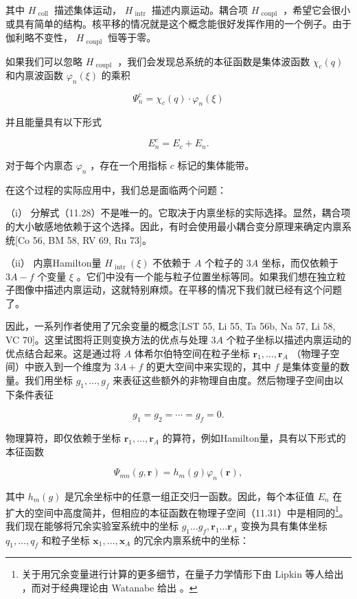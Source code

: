 其中 ${H}_{\text{ coll }}$ 描述集体运动， ${H}_{\text{ intr }}$ 描述内禀运动。耦合项
${H}_{\text{ coupl }}$ ，希望它会很小或具有简单的结构。核平移的情况就是这个概念能很好发挥作用的一个例子。由于伽利略不变性，
${H}_{\text{ coupl }}$ 恒等于零。

如果我们可以忽略 ${H}_{\text{ coupl }}$ ，我们会发现总系统的本征函数是集体波函数 ${\chi}_{c}\left(q\right)$
和内禀波函数 ${\varphi}_{n}\left(\xi\right)$ 的乘积

\[
{\Psi}^{c}_{n}={\chi}_{c}\left(q\right)\cdot{\varphi}_{n}\left(\xi\right)\tag{11.29}
\]

并且能量具有以下形式

\[
{E}^{c}_{n}={E}_{c}+{E}_{n}.\tag{11.30}
\]

对于每个内禀态 ${\varphi}_{n}$ ，存在一个用指标 $c$ 标记的集体能带。

在这个过程的实际应用中，我们总是面临两个问题：

（i） 分解式（11.28）不是唯一的。它取决于内禀坐标的实际选择。显然，耦合项的大小敏感地依赖于这个选择。因此，有时会使用最小耦合变分原理来确定内禀系统{[}Co
56, BM 58, RV 69, Ru 73{]}。

（ii） 内禀Hamilton量 ${H}_{\text{ intr }}\left(\xi\right)$ 不依赖于 $A$
个粒子的 ${3A}$ 坐标，而仅依赖于 ${3A}-f$ 个变量 $\xi$ 。它们中没有一个能与粒子位置坐标等同。如果我们想在独立粒子图像中描述内禀运动，这就特别麻烦。在平移的情况下我们就已经有这个问题了。

因此，一系列作者使用了冗余变量的概念{[}LST 55, Li 55, Ta 56b, Na 57, Li 58, VC 70{]}。这里试图将正则变换方法的优点与处理
${3A}$ 个粒子坐标以描述内禀运动的优点结合起来。这是通过将 $A$ 体希尔伯特空间在粒子坐标 ${\boldsymbol{r}}_{1},\ldots,{\boldsymbol{r}}_{A}$
（物理子空间）中嵌入到一个维度为 ${3A}+f$ 的更大空间中来实现的，其中 $f$ 是集体变量的数量。我们用坐标 ${g}_{1},\ldots,{g}_{f}$
来表征这些额外的非物理自由度。然后物理子空间由以下条件表征

\[
{g}_{1}={g}_{2}=\cdots={g}_{f}=0.\tag{11.31}
\]

物理算符，即仅依赖于坐标 ${\boldsymbol{r}}_{1},\ldots,{\boldsymbol{r}}_{A}$ 的算符，例如Hamilton量，具有以下形式的本征函数

\[
{\Psi}_{mn}\left({g,\boldsymbol{r}}\right)={h}_{m}\left(g\right){\varphi}_{n}\left(\boldsymbol{r}\right),\tag{11.32}
\]

其中 ${h}_{m}\left(g\right)$ 是冗余坐标中的任意一组正交归一函数。因此，每个本征值 ${E}_{n}$
在扩大的空间中高度简并，但相应的本征函数在物理子空间（11.31）中是相同的\footnote{关于用冗余变量进行计算的更多细节，在量子力学情形下由 Lipkin 等人给出 \cite{LST55}，而对于经典理论由 Watanabe
给出 \cite{Wa56}。}。我们现在能够将冗余实验室系统中的坐标 ${g}_{1}\ldots{g}_{f},{\boldsymbol{r}}_{1}\ldots{\boldsymbol{r}}_{A}$
变换为具有集体坐标 ${q}_{1},\ldots,{q}_{f}$ 和粒子坐标 ${\boldsymbol{x}}_{1},\ldots,{\boldsymbol{x}}_{A}$
的冗余内禀系统中的坐标：


